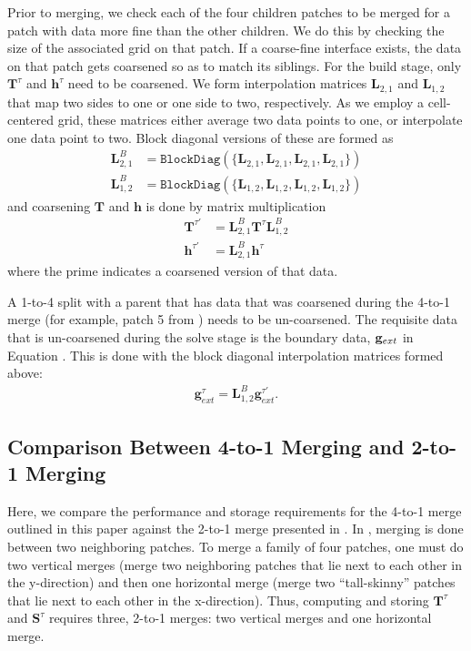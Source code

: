 Prior to merging, we check each of the four children patches to be merged for a patch with data more fine than the other children. We do this by checking the size of the associated grid on that patch. If a coarse-fine interface exists, the data on that patch gets coarsened so as to match its siblings. For the build stage, only $\mathbf{T}^{\tau}$ and $\textbf{h}^{\tau}$ need to be coarsened. We form interpolation matrices $\textbf{L}_{2,1}$ and $\textbf{L}_{1,2}$ that map two sides to one or one side to two, respectively. As we employ a cell-centered grid, these matrices either average two data points to one, or interpolate one data point to two. Block diagonal versions of these are formed as
\begin{align}
    \textbf{L}_{2,1}^{B} &= \texttt{BlockDiag}(\{\textbf{L}_{2,1}, \textbf{L}_{2,1}, \textbf{L}_{2,1}, \textbf{L}_{2,1}\}) \\
    \textbf{L}_{1,2}^{B} &= \texttt{BlockDiag}(\{\textbf{L}_{1,2}, \textbf{L}_{1,2}, \textbf{L}_{1,2}, \textbf{L}_{1,2}\})
\end{align}
and coarsening $\textbf{T}$ and $\textbf{h}$ is done by matrix multiplication
\begin{align}
    \textbf{T}^{\tau'} &= \textbf{L}_{2,1}^{B} \textbf{T}^{\tau} \textbf{L}_{1,2}^{B} \\
    \textbf{h}^{\tau'} &= \textbf{L}_{2,1}^{B} \textbf{h}^{\tau}
\end{align}
where the prime indicates a coarsened version of that data.

A 1-to-4 split with a parent that has data that was coarsened during the 4-to-1 merge (for example, patch 5 from ) needs to be un-coarsened. The requisite data that is un-coarsened during the solve stage is the boundary data, $\mathbf g_{ext}$ in Equation . This is done with the block diagonal interpolation matrices formed above:
\begin{align}
    \textbf{g}^{\tau}_{ext} = \textbf{L}_{1,2}^{B} \textbf{g}^{\tau'}_{ext}.
\end{align}

\subsection{Comparison Between 4-to-1 Merging and 2-to-1 Merging}
\label{sub:comparison_between_4t1_and2t1_merging}

Here, we compare the performance and storage requirements for the 4-to-1 merge outlined in this paper against the 2-to-1 merge presented in \cite{gillman2014direct}. In \cite{gillman2014direct}, merging is done between two neighboring patches. To merge a family of four patches, one must do two vertical merges (merge two neighboring patches that lie next to each other in the y-direction) and then one horizontal merge (merge two ``tall-skinny'' patches that lie next to each other in the x-direction). Thus, computing and storing $\textbf{T}^{\tau}$ and $\mathbf{S}^{\tau}$ requires three, 2-to-1 merges: two vertical merges and one horizontal merge.

